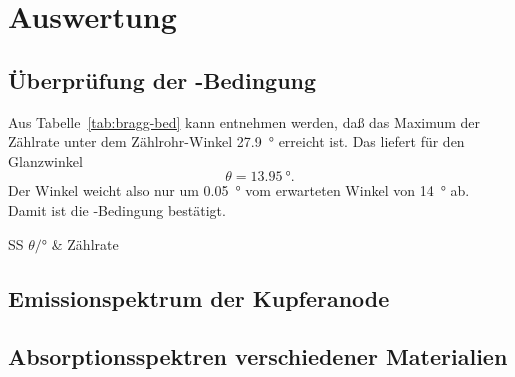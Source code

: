 
\section{Auswertung}

\subsection{Überprüfung der -Bedingung}

Aus Tabelle~\ref{tab:bragg-bed} kann entnehmen werden, daß das Maximum
der Zählrate unter dem Zählrohr-Winkel \SI{27.9}{\degree} erreicht
ist. Das liefert für den Glanzwinkel
%
\begin{equation}
  \theta = \SI{13.95}{\degree} .
\end{equation}
%
Der Winkel weicht also nur um \SI{0.05}{\degree} vom erwarteten Winkel
von \SI{14}{\degree} ab. Damit ist die -Bedingung bestätigt.


\begin{table}
  \centering
  \begin{tabular}{SS}
    \toprule
    {$\theta/\si{\degree}$} & {Zählrate} \\
    \midrule
%    
    \bottomrule
  \end{tabular}
  \caption{Die Meßwerte zur Überprüfung der -Bedingung. Der
    angegebene Winkel ist der Zählrohrwinkel. Der Kristallwinkel war
    fest auf \SI{14}{\degree} eingestellt.}
  \label{tab:bragg-bed}
\end{table}

\subsection{Emissionspektrum der Kupferanode}



\subsection{Absorptionsspektren verschiedener Materialien}

